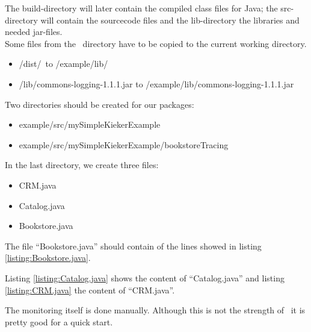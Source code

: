       The build-directory will later contain the compiled class files for Java; the src-directory will contain the sourcecode files and the lib-directory the libraries and needed jar-files.\\
      Some files from the \Kieker\ directory have to be copied to the current working directory.
      \begin{itemize}
	\item \KiekerDir/dist/\monitoringCtrlJar\ to /example/lib/\monitoringCtrlJar
	\item \KiekerDir/lib/commons-logging-1.1.1.jar to /example/lib/commons-logging-1.1.1.jar
      \end{itemize}
      Two directories should be created for our packages:
      \begin{itemize}
	\item example/src/mySimpleKiekerExample
	\item example/src/mySimpleKiekerExample/bookstoreTracing
      \end{itemize}
      In the last directory, we create three files: 
      \begin{itemize}
	\item CRM.java
	\item Catalog.java
	\item Bookstore.java
      \end{itemize}
      The file ``Bookstore.java'' should contain of the lines showed in listing \ref{listing:Bookstore.java}.
      \setJavaCodeListing
      \lstset{caption=Bookstore.java, label=listing:Bookstore.java}
      
      Listing \ref{listing:Catalog.java} shows the content of ``Catalog.java'' and listing \ref{listing:CRM.java} the content of ``CRM.java''.
      \lstset{caption=Catalog.java, label=listing:Catalog.java}
      
      \lstset{caption=CRM.java, label=listing:CRM.java}
      
      The monitoring itself is done manually. Although this is not the strength of \Kieker\ it is pretty good for a quick start.

